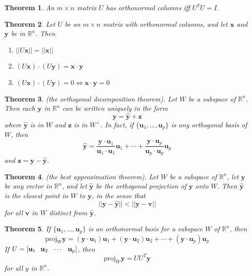 \documentclass{article}
\theoremstyle{plain}
\newtheorem{thm}{Theorem}[section]
\theoremstyle{definition}
\theoremstyle{remark}
\begin{document}
\begin{thm}
    An \(m\times n\) matrix \(U\) has orthonormal columns iff \(U^T U=I\).
\end{thm} 

\begin{thm}
    Let \(U\) be an \(m\times n\) matrix with orthonormal columns, and let \(\textbf{x}\) and \(\textbf{y}\) be in \(\mathbb{R}^n\). Then
    \begin{enumerate}
        \item[a.] \(||U\textbf{x}||=||\textbf{x}||\)
        \item[b.] \((U\textbf{x})\cdot(U\textbf{y})=\textbf{x}\cdot\textbf{y}\)
        \item[c.] \((U\textbf{x})\cdot(U\textbf{y})=0\iff\textbf{x}\cdot\textbf{y}=0\)
    \end{enumerate}
\end{thm}

\begin{thm} (the orthogonal decomposition theorem).
    Let \(W\) be a subspace of \(\mathbb{R}^n\). Then each \(\textbf{y}\) in \(\mathbb{R}^n\) can be written uniquely in the form \[\textbf{y}=\hat{\textbf{y}}+\textbf{z}\] where \(\hat{\textbf{y}}\) is in \(W\) and \(\textbf{z}\) is in \(W^{\perp}\). In fact, if \(\{\textbf{u}_1,\ldots,\textbf{u}_p\}\) is any orthogonal basis of \(W\), then \[\hat{\textbf{y}}=\frac{\textbf{y}\cdot\textbf{u}_1}{\textbf{u}_1\cdot\textbf{u}_1}\textbf{u}_1+\cdots+\frac{\textbf{y}\cdot\textbf{u}_p}{\textbf{u}_p\cdot\textbf{u}_p}\textbf{u}_p\] and \(\textbf{z}=\textbf{y}-\hat{\textbf{y}}\).
\end{thm}

\begin{thm} (the best approximation theorem).
    Let \(W\) be a subspace of \(\mathbb{R}^n\), let \(\textbf{y}\) be any vector in \(\mathbb{R}^n\), and let \(\hat{\textbf{y}}\) be the orthogonal projection of \(\textbf{y}\) onto \(W\). Then \(\hat{\textbf{y}}\) is the closest point in \(W\) to \(\textbf{y}\), in the sense that \[||\textbf{y}-\hat{\textbf{y}}||<||\textbf{y}-\textbf{v}||\] for all \(\textbf{v}\) in \(W\) distinct from \(\hat{\textbf{y}}\).
\end{thm}

\begin{thm}
    If \(\{\textbf{u}_1,\ldots,\textbf{u}_p\}\) is an orthonormal basis for a subspace \(W\) of \(\mathbb{R}^n\), then \[\text{proj}_{W}\textbf{y}=(\textbf{y}\cdot\textbf{u}_1)\textbf{u}_1+(\textbf{y}\cdot\textbf{u}_2)\textbf{u}_2+\cdots+(\textbf{y}\cdot\textbf{u}_p)\textbf{u}_p\] If \(U=\left[\textbf{u}_1\hspace{.25cm}\textbf{u}_2\hspace{.25cm}\cdots\hspace{.25cm}\textbf{u}_p\right]\), then \[\text{proj}_{W}\textbf{y}=U U^T\textbf{y}\] for all \(y\) in \(\mathbb{R}^n\).
\end{thm}
\end{document}
